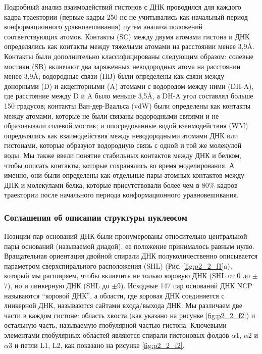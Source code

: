     Подробный анализ взаимодействий гистонов с ДНК проводился для каждого кадра траектории (первые кадры 250 нс не учитывались как начальный период конформационного уравновешивания) путем анализа положений соответствующих атомов. Контакты (SC) между двумя атомами гистона и ДНК определялись как контакты между тяжелыми атомами на расстоянии менее 3,9\AA. Контакты были дополнительно классифицированы следующим образом: солевые мостики (SB) включают два заряженных неводородных атома на расстоянии менее 3,9\AA; водородные связи (HB) были определены как связи между донорными (D) и акцепторными (A) атомами с водородом между ними (DH-A), где расстояние между D и A было меньше 3,5\AA, а DH-A угол составлял больше 150 градусов; контакты Ван-дер-Ваальса (vdW) были определены как контакты между атомами, которые не были связаны водородными связями и не образовывали солевой мостик; и опосредованные водой взаимодействия (WM) определялись как взаимодействия между неводородными атомами ДНК или гистонами, которые образуют водородную связь с одной и той же молекулой воды. Мы также ввели понятие стабильных контактов между ДНК и белком, чтобы описать контакты, которые сохранялись во время моделирования. А именно, они были определены как отдельные пары атомных контактов между ДНК и молекулами белка, которые присутствовали более чем в 80\% кадров траектории после начального периода конформационного уравновешивания.

\subsubsection{Соглашения об описании структуры нуклеосом}
    Позиции пар оснований ДНК были пронумерованы относительно центральной пары оснований (называемой диадой), ее положение принималось равным нулю. Вращательная ориентация двойной спирали ДНК полуколичественно описывается параметром сверхспирального расположения (SHL) (Рис. \ref{fig:p2_2_f1}a), который мы расширяем, чтобы включить не только коровую ДНК (SHL от 0 до $\pm$7), но и линкерную ДНК (SHL до $\pm$9). Исходные 147 пар оснований ДНК NCP называются ``коровой ДНК'', а области, где коровая ДНК соединяется с линкерной ДНК, называются сайтами входа/выхода ДНК. Мы различаем две части в каждом гистоне: область хвоста (как указано на рисунке \ref{fig:p2_2_f2}) и остальную часть, называемую глобулярной частью гистона. Ключевыми элементами глобулярных областей являются спирали гистоновых фолдов $\alpha$1, $\alpha$2 и $\alpha$3 \cite{baxevanis_variety_1995} и петли L1, L2, как показано на рисунке \ref{fig:p2_2_f2}.


